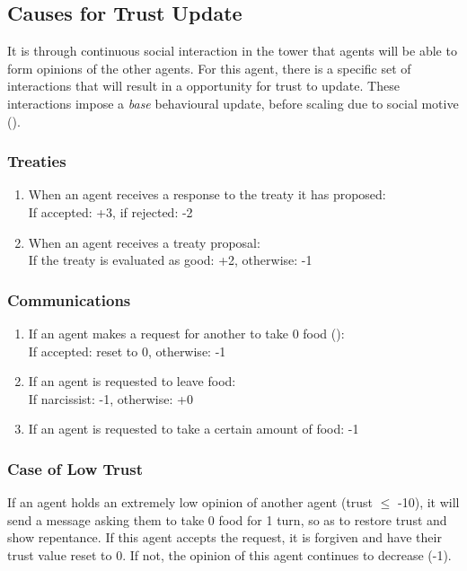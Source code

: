 \subsection{Causes for Trust Update}

It is through continuous social interaction in the tower that agents will be able to form opinions of the other agents. For this agent, there is a specific set of interactions that will result in a opportunity for trust to update. These interactions impose a \textit{base} behavioural update, before scaling due to social motive ().

\subsubsection{Treaties}

\begin{enumerate}
    \item When an agent receives a response to the treaty it has proposed: \\ If accepted: +3, if rejected: -2
    \item When an agent receives a treaty proposal: \\ If the treaty is evaluated as good: +2, otherwise: -1
\end{enumerate}

\subsubsection{Communications}\label{communication}

\begin{enumerate}
    \item If an agent makes a request for another to take 0 food (): \\
    If accepted: reset to 0, otherwise: -1
    \item If an agent is requested to leave food: \\ If narcissist: -1, otherwise: +0
    \item If an agent is requested to take a certain amount of food: -1
\end{enumerate}

\subsubsection{Case of Low Trust} \label{sec:takeNone}

If an agent holds an extremely low opinion of another agent (trust $\leq$ -10), it will send a message asking them to take 0 food for 1 turn, so as to restore trust and show repentance. If this agent accepts the request, it is forgiven and have their trust value reset to 0. If not, the opinion of this agent continues to decrease (-1).

